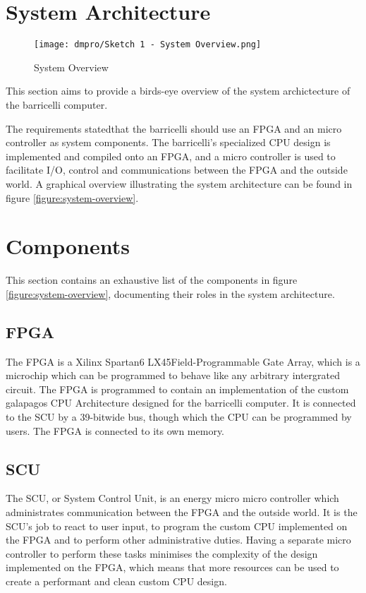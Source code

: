 \section{System Architecture}

\begin{figure}[H]
\texttt{[image: dmpro/Sketch 1 - System Overview.png]}
\caption{System Overview}
\label{figure:system-overview}
\end{figure}

This section aims to provide a birds-eye overview of the system archictecture of the \Gls{barricelli} computer.

The requirements stated\cn that the \Gls{barricelli} should use an FPGA and an micro controller as system components.
The \Gls{barricelli}'s specialized CPU design is implemented and compiled onto an FPGA, and a micro controller is used to facilitate I/O, control and communications between the FPGA and the outside world.
A graphical overview illustrating the system architecture can be found in figure \vref{figure:system-overview}.

\section{Components}

This section contains an exhaustive list of the components in figure \vref{figure:system-overview}, documenting their roles in the system architecture.

\subsection{FPGA}

The FPGA is a Xilinx Spartan6 LX45\cn Field-Programmable Gate Array, which is a microchip which can be programmed to behave like any arbitrary intergrated circuit.
The FPGA is programmed to contain an implementation of the custom \Gls{galapagos} CPU Architecture designed for the \Gls{barricelli} computer.
It is connected to the SCU by a 39-bit\cn wide bus, though which the CPU can be programmed by users.
The FPGA is connected to its own memory.

\subsection{SCU}

The SCU, or System Control Unit, is an energy micro micro controller  which administrates communication between the FPGA and the outside world.
It is the SCU's job to react to user input, to program the custom CPU implemented on the FPGA and to perform other administrative duties.
Having a separate micro controller to perform these tasks minimises the complexity of the design implemented on the FPGA, which means that more resources can be used to create a performant and clean custom CPU design.

